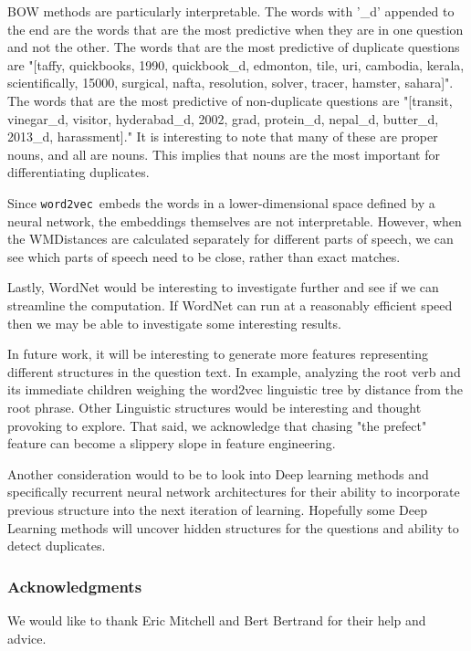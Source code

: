 \documentclass{article} %
\newcommand{\wordtvec}{\texttt{word2vec}}
\begin{document}
	BOW methods are particularly interpretable. The words with '\_d' appended to the end are the words that are the most predictive when they are in one question and not the other. The words that are the most predictive of duplicate questions are "[taffy, quickbooks, 1990, quickbook\_d, edmonton, tile, uri, cambodia, kerala, scientifically, 15000, surgical, nafta, resolution, solver, tracer, hamster, sahara]". The words that are the most predictive of non-duplicate questions are "[transit, vinegar\_d, visitor, hyderabad\_d, 2002, grad, protein\_d, nepal\_d, butter\_d, 2013\_d, harassment]." It is interesting to note that many of these are proper nouns, and all are nouns. This implies that nouns are the most important for differentiating duplicates.
	
	Since \wordtvec\ embeds the words in a lower-dimensional space defined by a neural network, the embeddings themselves are not interpretable. However, when the WMDistances are calculated separately for different parts of speech, we can see which parts of speech need to be close, rather than exact matches. 
	
	Lastly, WordNet would be interesting to investigate further and see if we can streamline the computation. If WordNet can run at a reasonably efficient speed then we may be able to investigate some interesting results. 
	
	In future work, it will be interesting to generate more features representing different structures in the question text. In example, analyzing the root verb and its immediate children weighing the word2vec linguistic tree by distance from the root phrase. Other Linguistic structures would be interesting and thought provoking to explore. That said, we acknowledge that chasing "the prefect" feature can become a slippery slope in feature engineering.
	
	Another consideration would to be to look into Deep learning methods and specifically recurrent neural network architectures for their ability to incorporate previous structure into the next iteration of learning. Hopefully some Deep Learning methods will uncover hidden structures for the questions and ability to detect duplicates.
	
	\subsubsection*{Acknowledgments}
	
	We would like to thank Eric Mitchell and Bert Bertrand for their help and advice.
	
	\printbibliography
	
\end{document}
